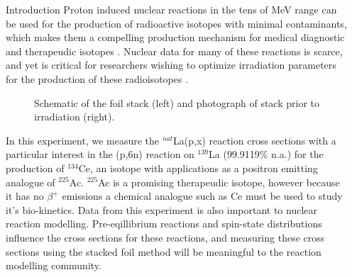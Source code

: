 \documentclass[final]{beamer}
\newlength{\sepwid}
\newlength{\onecolwid}
\begin{document}
\begin{frame}[t] %
\begin{columns}[t] %
\begin{column}{\sepwid}\end{column} %
\begin{column}{\onecolwid} %
\begin{block}{Introduction}
\small{\hspace*{50pt}Proton induced nuclear reactions in the tens of MeV range can be used for the production of radioactive isotopes with minimal contaminants, which makes them a compelling production mechanism for medical diagnostic and therapeudic isotopes \cite{TARKANYI2016262}.  Nuclear data for many of these reactions is scarce, and yet is critical for researchers wishing to optimize irradiation parameters for the production of these radioisotopes \cite{nuclear_data_needs}.
}

\begin{figure}
\caption{Schematic of the foil stack (left) and photograph of stack prior to irradiation (right).}
\end{figure}

\small{\hspace*{50pt}In this experiment, we measure the $^{nat}$La(p,x) reaction cross sections with a particular interest in the (p,6n) reaction on $^{139}$La (99.9119\% n.a.) \cite{ensdf} for the production of $^{134}$Ce, an isotope with applications as a positron emitting analogue of $^{225}$Ac.  $^{225}$Ac is a promising therapeudic isotope, however because it has no $\beta^+$ emissions a chemical analogue such as Ce must be used to study it's bio-kinetics.  Data from this experiment is also important to nuclear reaction modelling.  Pre-eqillibrium reactions and spin-state distributions influence the cross sections for these reactions, and measuring these cross sections using the stacked foil method will be meaningful to the reaction modelling community.

}
\end{block}
\end{column}
\end{columns}
\end{frame}
\end{document}
